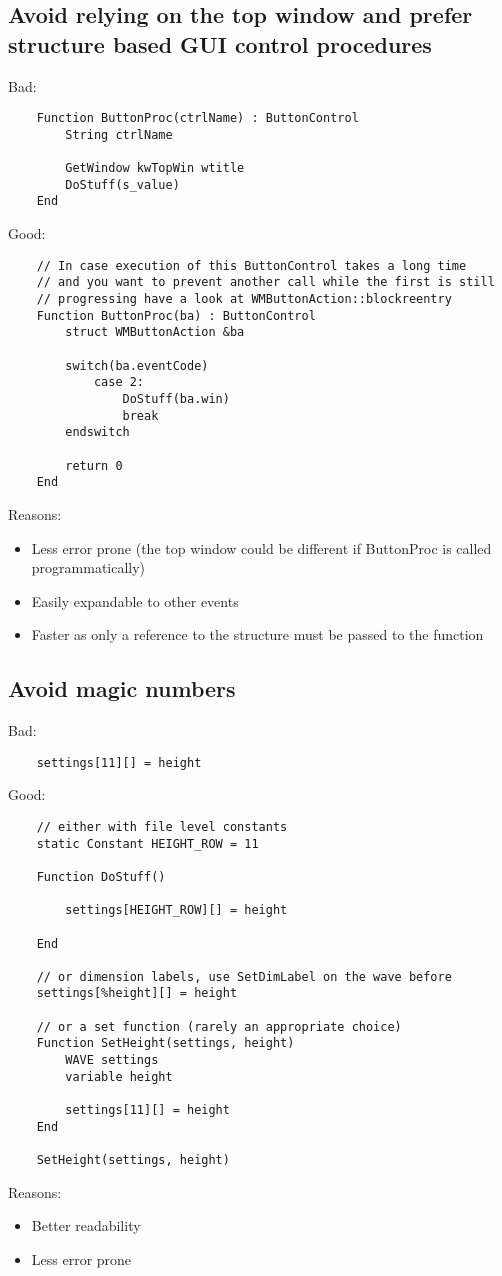 \documentclass{scrartcl}
\begin{document}
\subsection{Avoid relying on the top window and prefer structure based GUI control procedures}
Bad:
\begin{verbatim}
	Function ButtonProc(ctrlName) : ButtonControl
		String ctrlName

		GetWindow kwTopWin wtitle
		DoStuff(s_value)
	End
\end{verbatim}
Good:
\begin{verbatim}
	// In case execution of this ButtonControl takes a long time
	// and you want to prevent another call while the first is still
	// progressing have a look at WMButtonAction::blockreentry
	Function ButtonProc(ba) : ButtonControl
		struct WMButtonAction &ba

		switch(ba.eventCode)
			case 2:
				DoStuff(ba.win)
				break
		endswitch

		return 0
	End
\end{verbatim}
Reasons:
\begin{itemize}
  \item Less error prone (the top window could be different if ButtonProc is called programmatically)
  \item Easily expandable to other events
  \item Faster as only a reference to the structure must be passed to the function
\end{itemize}
%
\subsection{Avoid magic numbers}
Bad:
\begin{verbatim}
	settings[11][] = height
\end{verbatim}
Good:
\begin{verbatim}
	// either with file level constants
	static Constant HEIGHT_ROW = 11

	Function DoStuff()

		settings[HEIGHT_ROW][] = height

	End

	// or dimension labels, use SetDimLabel on the wave before
	settings[%height][] = height

	// or a set function (rarely an appropriate choice)
	Function SetHeight(settings, height)
		WAVE settings
		variable height

		settings[11][] = height
	End

	SetHeight(settings, height)
\end{verbatim}
Reasons:
\begin{itemize}
	\item Better readability
	\item Less error prone
\end{itemize}
%
\end{document}

